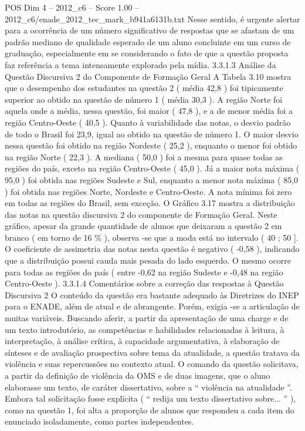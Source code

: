 \begin{textsample}{POS Dim 4 – 2012\_c6 – Score 1.00 – 2012\_c6/enade\_2012\_tec\_mark\_b941a6131b.txt}
Nesse sentido, é urgente alertar para a ocorrência de um número significativo de respostas que se afastam de um padrão mediano de qualidade esperado de um aluno concluinte em um curso de graduação, especialmente em se considerando o fato de que a questão proposta faz referência a tema intensamente explorado pela mídia. 3.3.1.3 Análise da Questão Discursiva 2 do Componente de Formação Geral A Tabela 3.10 mostra que o desempenho dos estudantes na questão 2 ( média 42,8 ) foi tipicamente superior ao obtido na questão de número 1 ( média 30,3 ).
A região Norte foi aquela onde a média, nessa questão, foi maior ( 47,8 ), e a de menor média foi a região Centro-Oeste ( 40,5 ).
Quanto à variabilidade das notas, o desvio padrão de todo o Brasil foi 23,9, igual ao obtido na questão de número 1.
O maior desvio nessa questão foi obtido na região Nordeste ( 25,2 ), enquanto o menor foi obtido na região Norte ( 22,3 ).
A mediana ( 50,0 ) foi a mesma para quase todas as regiões do país, exceto na região Centro-Oeste ( 45,0 ).
Já a maior nota máxima ( 95,0 ) foi obtida nas regiões Sudeste e Sul, enquanto a menor nota máxima ( 85,0 ) foi obtida nas regiões Norte, Nordeste e Centro-Oeste.
A nota mínima foi zero em todas as regiões do Brasil, sem exceção.
O Gráfico 3.17 mostra a distribuição das notas na questão discursiva 2 do componente de Formação Geral.
Neste gráfico, apesar da grande quantidade de alunos que deixaram a questão 2 em branco ( em torno de 16 \% ), observa -se que a moda está no intervalo ( 40 ; 50 ].
O coeficiente de assimetria das notas nesta questão é negativo ( -0,58 ), indicando que a distribuição possui cauda mais pesada do lado esquerdo.
O mesmo ocorre para todas as regiões do país ( entre -0,62 na região Sudeste e -0,48 na região Centro-Oeste ). 3.3.1.4 Comentários sobre a correção das respostas à Questão Discursiva 2 O conteúdo da questão era bastante adequado às Diretrizes do INEP para o ENADE, além de atual e de abrangente.
Porém, exigia -se a articulação de muitas variáveis.
Buscando aferir, a partir da apresentação de uma charge e de um texto introdutório, as competências e habilidades relacionadas à leitura, à interpretação, à análise crítica, à capacidade argumentativa, à elaboração de sínteses e de avaliação prospectiva sobre tema da atualidade, a questão tratava da violência e suas repercussões no contexto atual.
O comando da questão solicitava, a partir da definição de violência da OMS e de duas imagens, que o aluno elaborasse um texto, de caráter dissertativo, sobre a “ violência na atualidade ”.
Embora tal solicitação fosse explícita ( “ redija um texto dissertativo sobre... ” ), como na questão 1, foi alta a proporção de alunos que respondeu a cada item do enunciado isoladamente, como partes independentes.

\end{textsample}
